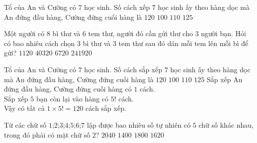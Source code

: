\begin{ex}%
	Tổ của An và Cường có $7$ học sinh. Số cách xếp $7$ học sinh ấy theo hàng dọc mà An đứng đầu hàng, Cường đứng cuối hàng là
	\choice
	{\True $120$}
	{$100$}
	{$110$}
	{$125$}
\end{ex}%
\begin{ex}%
	Một người có $8$ bì thư và $6$ tem thư, người đó cần gửi thư cho $3$ người bạn. Hỏi có bao nhiêu cách chọn $3$ bì thư và $3$ tem thư sau đó dán mỗi tem lên mỗi bì để gửi?
	\choice
	{$ 1120$}
	{$ 40320 $}
	{\True $ 6720 $}
	{$ 241920 $}
\end{ex}%
\begin{ex}%
	Tổ của An và Cường có $7$ học sinh. Số cách sắp xếp $7$ học sinh ấy theo hàng dọc mà An đứng đầu hàng, Cường đứng cuối hàng là
	\choice
	{\True $120$}
	{$100$}
	{$110$}
	{$125$}
	\loigiai
	{Sắp xếp An đứng đầu hàng, Cường đứng cuối hàng có $1$ cách.\\
	Sắp xếp $5$ bạn còn lại vào hàng có $5!$ cách.\\
	Vậy có tất cả $1\times 5!=120$ cách sắp xếp.	
	}
\end{ex}%
\begin{ex}%
	Từ các chữ số $1$;$2$;$3$;$4$;$5$;$6$;$7$ lập được bao nhiêu số tự nhiên có $5$ chữ số khác nhau, trong đó phải có mặt chữ số $2$?
	\choice
	{$2040$}
	{$1400$}
	{\True $1800$}
	{$1620$}
\end{ex}%
